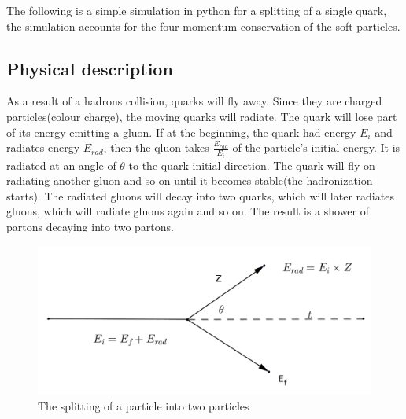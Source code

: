 The following is a simple simulation in python for a splitting of a single quark, the simulation accounts for the four momentum conservation of the soft particles.

\subsection{Physical description}
\noindent As a result of a hadrons collision, quarks will fly away. Since they are charged particles(colour charge), the moving quarks will radiate. The quark will lose part of its energy emitting a gluon. If at the beginning, the quark had energy $E_i$ and radiates energy $E_{rad}$, then the qluon takes $\frac{E_{rad}}{E_i}$ of the particle's initial energy.
It is radiated at an angle of $\theta$ to the quark initial direction. The quark will fly on radiating another gluon and so on until it becomes stable(the hadronization starts).
The radiated gluons will decay into two quarks, which will later radiates gluons,  which will radiate gluons again and so on. The result is a shower of partons decaying into two partons. 
\begin{figure}[hbtp]
\centering
\includegraphics[scale=.3]{images/tt.png}
\caption{The splitting of a particle into two particles}
\end{figure}




